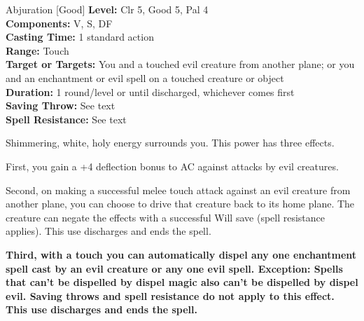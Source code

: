 {Abjuration [Good]}
{
	\textbf{Level:}
	Clr 5, Good 5, Pal 4\\
	\textbf{Components:}
	V, S, DF\\
	\textbf{Casting Time:}
	1 standard action\\
	\textbf{Range:}
	Touch\\
	\textbf{Target or Targets:}
	You and a touched evil creature from another plane; or you and an enchantment or evil spell on a touched creature or object\\
	\textbf{Duration:}
	1 round/level or until discharged, whichever comes first\\
	\textbf{Saving Throw:}
	See text\\
	\textbf{Spell Resistance:}
	See text\\
}
{
	Shimmering, white, holy energy surrounds you. This power has three effects.

	First, you gain a +4 deflection bonus to AC against attacks by evil creatures.

	Second, on making a successful melee touch attack against an evil creature from another plane, you can choose to drive that creature back to its home plane. The creature can negate the effects with a successful Will save (spell resistance applies). This use discharges and ends the spell.

	\textbf{	Third, with a touch you can automatically dispel any one enchantment spell cast by an evil creature or any one evil spell. Exception: Spells that can't be dispelled by dispel magic also can't be dispelled by dispel evil. Saving throws and spell resistance do not apply to this effect. This use discharges and ends the spell.}

}
